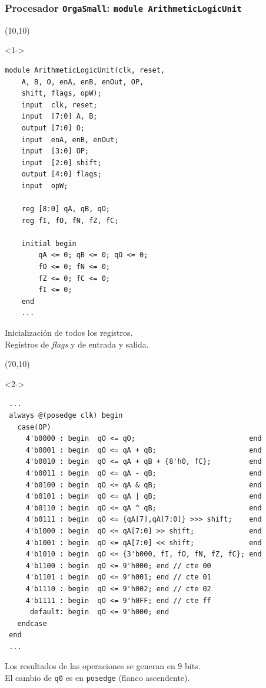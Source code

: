 \documentclass[aspectratio=169]{beamer}
\begin{document}
\begin{frame}[fragile,t]
    \frametitle{Procesador \texttt{OrgaSmall}: \texttt{module ArithmeticLogicUnit}}
    \begin{textblock}{55}(10,10)
    \begin{onlyenv}<1->
\lstset{basicstyle=\tiny}
\begin{lstlisting}
module ArithmeticLogicUnit(clk, reset,
    A, B, O, enA, enB, enOut, OP,
    shift, flags, opW);
    input  clk, reset;
    input  [7:0] A, B;
    output [7:0] O;
    input  enA, enB, enOut;
    input  [3:0] OP;
    input  [2:0] shift;
    output [4:0] flags;
    input  opW;
    
    reg [8:0] qA, qB, qO;
    reg fI, fO, fN, fZ, fC;
    
    initial begin
        qA <= 0; qB <= 0; qO <= 0;
        fO <= 0; fN <= 0;
        fZ <= 0; fC <= 0;
        fI <= 0;
    end
    ...
\end{lstlisting}
\small
    Inicialización de todos los registros.\\
    Registros de \emph{flags} y de entrada y salida.\\
    \end{onlyenv}
    \end{textblock}
    \begin{textblock}{80}(70,10)
    \begin{onlyenv}<2->
\lstset{basicstyle=\tiny}
\begin{lstlisting}
 ...
 always @(posedge clk) begin
   case(OP)
     4'b0000 : begin  qO <= qO;                           end
     4'b0001 : begin  qO <= qA + qB;                      end
     4'b0010 : begin  qO <= qA + qB + {8'h0, fC};         end
     4'b0011 : begin  qO <= qA - qB;                      end
     4'b0100 : begin  qO <= qA & qB;                      end
     4'b0101 : begin  qO <= qA | qB;                      end 
     4'b0110 : begin  qO <= qA ^ qB;                      end 
     4'b0111 : begin  qO <= {qA[7],qA[7:0]} >>> shift;    end
     4'b1000 : begin  qO <= qA[7:0] >> shift;             end 
     4'b1001 : begin  qO <= qA[7:0] << shift;             end 
     4'b1010 : begin  qO <= {3'b000, fI, fO, fN, fZ, fC}; end
     4'b1100 : begin  qO <= 9'h000; end // cte 00
     4'b1101 : begin  qO <= 9'h001; end // cte 01
     4'b1110 : begin  qO <= 9'h002; end // cte 02
     4'b1111 : begin  qO <= 9'h0FF; end // cte ff
      default: begin  qO <= 9'h000; end
   endcase
 end
 ...
\end{lstlisting}
    \small
    Los resultados de las operaciones se generan en 9 bits.\\
    El cambio de \texttt{q0} es en \texttt{posedge} (flanco ascendente).\\
    \end{onlyenv}
    \end{textblock}
\end{frame}
\end{document}
